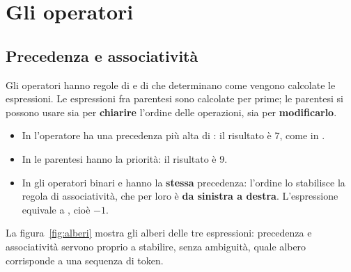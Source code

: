 \section{Gli operatori}

\subsection{Precedenza e associatività}

Gli operatori hanno regole di  e di 
che determinano come vengono calcolate le espressioni. Le espressioni fra
parentesi sono calcolate per prime; le parentesi si possono usare sia per
\textbf{chiarire} l'ordine delle operazioni, sia per \textbf{modificarlo}.

\begin{itemize}
  \item In  l'operatore \code{*} ha una precedenza più alta
        di \code{+}: il risultato è 7, come in .
  \item In  le parentesi hanno la priorità: il risultato è
        9.
  \item In  gli operatori binari \code{+} e
        \code{-} hanno la \textbf{stessa} precedenza: l'ordine lo stabilisce
        la regola di associatività, che per loro è \textbf{da sinistra a
        destra}. L'espressione equivale a ,
        cioè $-1$.
\end{itemize}

La figura~\ref{fig:alberi} mostra gli alberi delle tre espressioni:
precedenza e associatività servono proprio a stabilire, senza ambiguità,
quale albero corrisponde a una sequenza di token.


